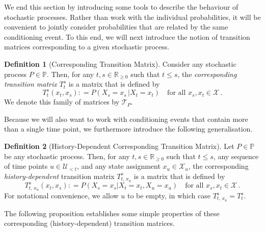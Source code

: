 \documentclass[10pt,a4paper]{paper}
\theoremstyle{definition}
\newtheorem{definition}{Definition}
\newcommand{\reals}{\mathbb{R}}
\newcommand{\realsnonneg}{\reals_{\geq 0}}
\newcommand{\states}{\mathcal{X}}
\newcommand{\processes}{\mathbb{P}}
\newcommand{\coloneqq}{:\!=}
\begin{document}
We end this section by introducing some tools to describe the behaviour of stochastic processes. Rather than work with the individual probabilities, it will be convenient to jointly consider probabilities that are related by the same conditioning event. To this end, we will next introduce the notion of transition matrices corresponding to a given stochastic process.

\begin{definition}[Corresponding Transition Matrix]\label{def:trans_matrix}
Consider any stochastic process $P\in\processes$. Then, for any $t,s\in\realsnonneg$ such that $t\leq s$, the \emph{corresponding transition matrix} $T_t^s$ is a matrix that is defined by
\begin{equation*}
T_t^s(x_t, x_s) \coloneqq P(X_s=x_s\,\vert X_t=x_t)\quad\text{for all $x_s,x_t\in\states$}\,.
\end{equation*}
We denote this family of matrices by $\mathcal{T}_P$.
\end{definition}

Because we will also want to work with conditioning events that contain more than a single time point, we furthermore introduce the following generalisation.

\begin{definition}[History-Dependent Corresponding Transition Matrix]
Let $P\in\processes$ be any stochastic process. Then, for any $t,s\in\realsnonneg$ such that $t\leq s$, any sequence of time points $u\in\mathcal{U}_{<t}$, and any state assignment $x_u\in\states_u$, the corresponding \emph{history-dependent} transition matrix $T_{t,\,x_u}^s$ is a matrix that is defined by
\begin{equation*}
T^s_{t,\,x_u}(x_t,x_s)
\coloneqq
P(X_s=x_s\vert X_t=x_t, X_u=x_u)\quad\text{for all $x_s,x_t\in\states$}\,.
\end{equation*}
For notational convenience, we allow $u$ to be empty, in which case $T_{t,\,x_u}^s=T_t^s$.
\end{definition}

The following proposition establishes some simple properties of these corresponding (history-dependent) transition matrices.
\end{document}

